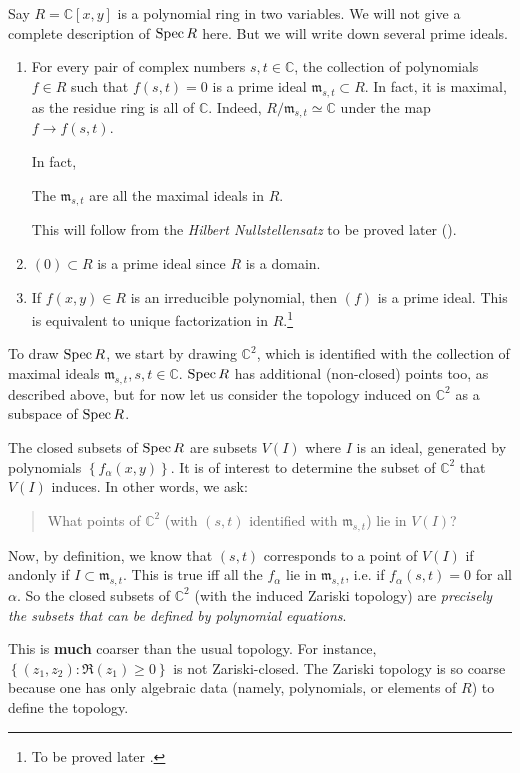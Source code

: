 \begin{example} \label{twovarpoly}
Say $R = \mathbb{C}[x,y]$ is a polynomial ring in two variables.
We will not give a complete description of $\operatorname{Spec} R$ here. But we will write
down several
prime ideals.

\begin{enumerate}
\item For every pair of complex numbers $s,t \in \mathbb{C}$,
the collection of polynomials
$f \in R$ such that $f(s,t) = 0$ is a prime ideal $\mathfrak{m}
_{s,t} \subset R$. In
fact, it is maximal, as the residue ring is all of
$\mathbb{C}$. Indeed,
$R/\mathfrak{m}_{s,t} \simeq \mathbb{C}$ under the map $f \to
f(s,t)$.

In fact, 
\begin{theorem}
The $\mathfrak{m}_{s,t}$ are all the maximal ideals in $R$.
\end{theorem} 
This will follow from the \emph{Hilbert Nullstellensatz} to be
proved later
().
\item $(0) \subset R$ is a prime ideal since $R$ is a domain. 
\item If $f(x,y) \in R$ is an irreducible polynomial, then $(f)$
is a prime
ideal. This is equivalent to unique factorization in
$R$.\footnote{To be
proved later \rref{}.}  
\end{enumerate}

To draw $\operatorname{Spec} R$, we start by drawing $\mathbb{C}^2$, which is identified
with the
collection of
maximal ideals $\mathfrak{m}_{s,t}, s, t \in \mathbb{C}$. $\operatorname{Spec} R$ has
additional (non-closed) points
too, as
described above, but for now let us
consider the topology induced on $\mathbb{C}^2$ as a subspace of
$\operatorname{Spec} R$.

The closed subsets of $\operatorname{Spec} R$ are subsets $V(I)$ where $I$ is
an ideal,
generated by polynomials $\left\{f_{\alpha}(x,y)\right\}$. It is of interest to
determine the subset of $\mathbb{C}^2$ that
$V(I)$
induces. In other words, we ask:
\begin{quote}
What points of $\mathbb{C}^2$ (with $(s,t)$ identified with
$\mathfrak{m}_{s,t}$) lie in $V(I)$?
\end{quote}
Now, by definition, we know that $(s,t)$ corresponds to a point of $V(I)$ if
andonly if $I
\subset \mathfrak{m}_{s,t}$.
This is true iff all the
$f_{\alpha} $ lie in $ \mathfrak{m}_{s,t}$, i.e. if
$f_{\alpha}(s,t) =0$ for all
$\alpha$. So the closed subsets of $\mathbb{C}^2$ (with the
induced Zariski
topology) are \emph{precisely the subsets
that can be defined by polynomial equations}.

This is
\textbf{much} coarser
than the usual topology. For instance, $\left\{(z_1,z_2):
\Re(z_1) \geq 0\right\}$ is
not Zariski-closed. 
The Zariski topology is so coarse because one has only algebraic
data (namely,
polynomials, or elements of $R$) to define the topology.
\end{example} 

